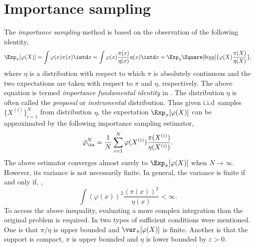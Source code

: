 \section{Importance sampling}
\label{sec:Importance sampling}

The \emph{importance sampling} method is based on the observation of the following identity,
\begin{equation}
  \Exp_{\pi}[\varphi(X)]
  = \int\varphi(x)\pi(x)\intd x
  = \int\varphi(x)\frac{\pi(x)}{\eta(x)}\eta(x)\intd x
  = \Exp_{\eta}\Square[bigg]{\varphi(X)\frac{\pi(X)}{\eta(X)}},
  \label{eq:impotance fundamental}
\end{equation}
where $\eta$ is a distribution with respect to which $\pi$ is absolutely continuous and the two expectations are taken with respect to $\pi$ and $\eta$, respectively. The above equation is termed \emph{importance fundamental identity} in \cite{Robert:2004tn}. The distribution $\eta$ is often called the \emph{proposal} or \emph{instrumental} distribution. Thus given i.i.d\ samples $\{X^{(i)}\}_{i=1}^N$ from distribution $\eta$, the expectation $\Exp_{\pi}[\varphi(X)]$ can be approximated by the following importance sampling estimator,
\begin{equation}
  \hat\varphi_{\is}^N
  = \frac{1}{N}\sum_{i=1}^N\varphi(X^{(i)})\frac{\pi(X^{(i)})}{\eta(X^{(i)})}.
  \label{eq:is normalized}
\end{equation}
The above estimator converges almost surely to $\Exp_{\pi}[\varphi(X)]$ when $N\to\infty$. However, its variance is not necessarily finite. In general, the variance is finite if and only if, \cite[][sec.~3.3.2]{Robert:2004tn},
\begin{equation}
  \int(\varphi(x))^2\frac{(\pi(x))^2}{\eta(x)} < \infty.
\end{equation}
To access the above inequality, evaluating a more complex integration than the original problem is required. In \cite{Geweke:1989tm} two types of sufficient conditions were mentioned. One is that $\pi/\eta$ is upper bounded and $\var_{\pi}[\varphi(X)]$ is finite. Another is that the support is compact, $\pi$ is upper bounded and $\eta$ is lower bounded by $\varepsilon > 0$.

